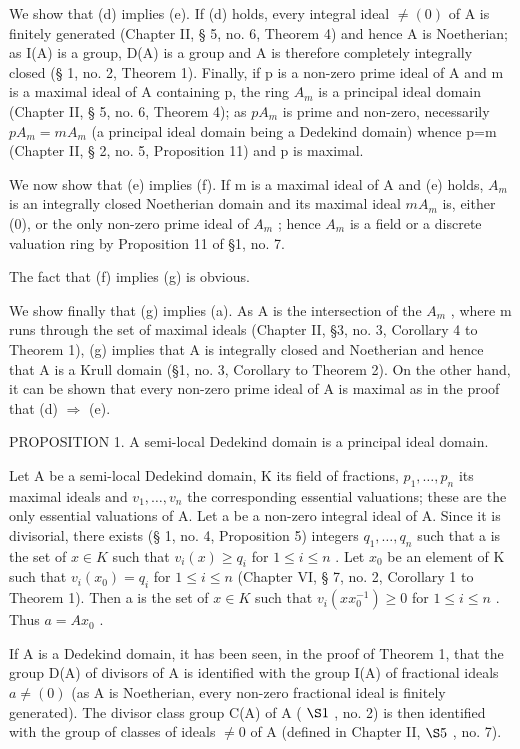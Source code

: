 We show that (d) implies (e). If (d) holds, every integral ideal \(\neq(0)\) of A is finitely generated (Chapter II, § 5, no. 6, Theorem 4) and hence A is Noetherian; as I(A) is a group, D(A) is a group and A is therefore completely integrally closed (§ 1, no. 2, Theorem 1). Finally, if p is a non-zero prime ideal of A and m is a maximal ideal of A containing p, the ring \(A_{m}\) is a principal ideal domain (Chapter II, § 5, no. 6, Theorem 4); as \(pA_{m}\) is prime and non-zero, necessarily \(pA_{m}=mA_{m}\) (a principal ideal domain being a Dedekind domain) whence p=m (Chapter II, § 2, no. 5, Proposition 11) and p is maximal.

We now show that (e) implies (f). If m is a maximal ideal of A and (e) holds, \(A_{m}\) is an integrally closed Noetherian domain and its maximal ideal \(mA_{m}\) is, either (0), or the only non-zero prime ideal of \(A_{m}\) ; hence \(A_{m}\) is a field or a discrete valuation ring by Proposition 11 of §1, no. 7.

The fact that (f) implies (g) is obvious.

We show finally that (g) implies (a). As A is the intersection of the \(A_{m}\) , where m runs through the set of maximal ideals (Chapter II, §3, no. 3, Corollary 4 to Theorem 1), (g) implies that A is integrally closed and Noetherian and hence that A is a Krull domain (§1, no. 3, Corollary to Theorem 2). On the other hand, it can be shown that every non-zero prime ideal of A is maximal as in the proof that (d) \(\Rightarrow\) (e).

PROPOSITION 1. A semi-local Dedekind domain is a principal ideal domain.

Let A be a semi-local Dedekind domain, K its field of fractions, \(p_{1}, \ldots, p_{n}\) its maximal ideals and \(v_{1}, \ldots, v_{n}\) the corresponding essential valuations; these are the only essential valuations of A. Let a be a non-zero integral ideal of A. Since it is divisorial, there exists (§ 1, no. 4, Proposition 5) integers \(q_{1}, \ldots, q_{n}\) such that a is the set of \(x \in K\) such that \(v_{i}(x) \geqslant q_{i}\) for \(1 \leqslant i \leqslant n\) . Let \(x_{0}\) be an element of K such that \(v_{i}(x_{0}) = q_{i}\) for \(1 \leqslant i \leqslant n\) (Chapter VI, § 7, no. 2, Corollary 1 to Theorem 1). Then a is the set of \(x \in K\) such that \(v_{i}(xx_{0}^{-1}) \geqslant 0\) for \(1 \leqslant i \leqslant n\) . Thus \(a = Ax_{0}\) .

If A is a Dedekind domain, it has been seen, in the proof of Theorem 1, that the group D(A) of divisors of A is identified with the group I(A) of fractional ideals \(a \neq (0)\) (as A is Noetherian, every non-zero fractional ideal is finitely generated). The divisor class group C(A) of A ( \(\S 1\) , no. 2) is then identified with the group of classes of ideals \(\neq 0\) of A (defined in Chapter II, \(\S 5\) , no. 7).


